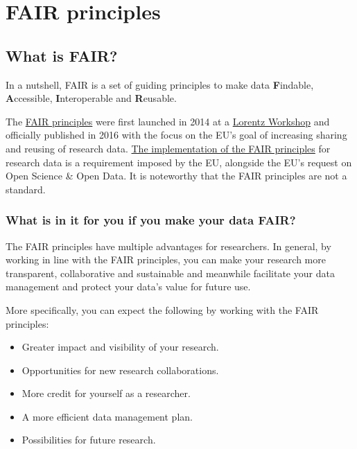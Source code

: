 \documentclass[
]{book}
\begin{document}
\hypertarget{fair-principles}{%
\chapter{FAIR principles}\label{fair-principles}}

\hypertarget{what-is-fair}{%
\section{What is FAIR?}\label{what-is-fair}}

In a nutshell, FAIR is a set of guiding principles to make data \textbf{F}indable, \textbf{A}ccessible, \textbf{I}nteroperable and \textbf{R}eusable.

The \href{https://www.go-fair.org/fair-principles/}{FAIR principles} were first launched in 2014 at a \href{https://www.lorentzcenter.nl/}{Lorentz Workshop} and officially published in 2016 with the focus on the EU's goal of increasing sharing and reusing of research data. \href{https://eur-lex.europa.eu/legal-content/EN/TXT/?uri=uriserv:OJ.L_.2019.172.01.0056.01.ENG}{The implementation of the FAIR principles} for research data is a requirement imposed by the EU, alongside the EU's request on Open Science \& Open Data. It is noteworthy that the FAIR principles are not a standard.

\hypertarget{what-is-in-it-for-you-if-you-make-your-data-fair}{%
\subsection*{What is in it for you if you make your data FAIR?}\label{what-is-in-it-for-you-if-you-make-your-data-fair}}

The FAIR principles have multiple advantages for researchers. In general, by working in line with the FAIR principles, you can make your research more transparent, collaborative and sustainable and meanwhile facilitate your data management and protect your data's value for future use.

More specifically, you can expect the following by working with the FAIR principles:

\begin{itemize}
\item
  Greater impact and visibility of your research.
\item
  Opportunities for new research collaborations.
\item
  More credit for yourself as a researcher.
\item
  A more efficient data management plan.
\item
  Possibilities for future research.
\end{itemize}
\end{document}
